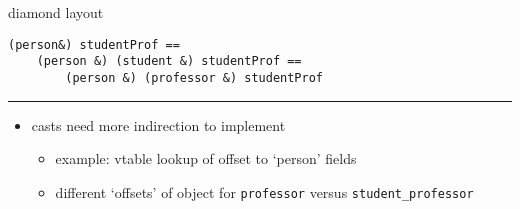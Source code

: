 \begin{frame}[fragile,label=diamLayout]{diamond layout}
\lstset{language=C++,style=small}
\begin{lstlisting}
(person&) studentProf ==
    (person &) (student &) studentProf ==
        (person &) (professor &) studentProf
\end{lstlisting}
\hrule
\begin{itemize}
\item casts need more indirection to implement
    \begin{itemize}
    \item example: vtable lookup of offset to `person' fields
    \item different `offsets' of object for \texttt{professor} versus \texttt{student\_professor}
    \end{itemize}
\end{itemize}
\end{frame}
